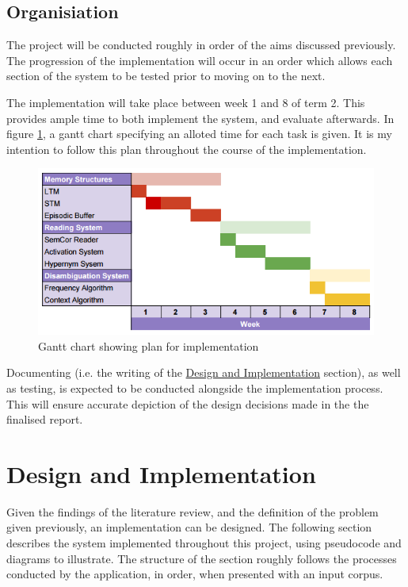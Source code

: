 \documentclass[]{article}
\begin{document}
\subsection{Organisiation}
\label{PAOrganisation}
The project will be conducted roughly in order of the aims discussed previously. The progression of the implementation will occur in an order which allows each section of the system to be tested prior to moving on to the next.

The implementation will take place between week 1 and 8 of term 2. This provides ample time to both implement the system, and evaluate afterwards. In figure \ref{fig:gantt}, a gantt chart specifying an alloted time for each task is given. It is my intention to follow this plan throughout the course of the implementation.

\begin{figure}[h]
	\includegraphics[scale=0.5]{gantt.png}
	\caption{Gantt chart showing plan for implementation}
	\label{fig:gantt}
\end{figure}

Documenting (i.e. the writing of the \hyperref[sec:Implementation]{Design and Implementation} section), as well as testing, is expected to be conducted alongside the implementation process. This will ensure accurate depiction of the design decisions made in the the finalised report.


\section{Design and Implementation}
\label{sec:Implementation}
Given the findings of the literature review, and the definition of the problem given previously, an implementation can be designed. The following section describes the system implemented throughout this project, using pseudocode and diagrams to illustrate. The structure of the section roughly follows the processes conducted by the application, in order, when presented with an input corpus.
\end{document}

